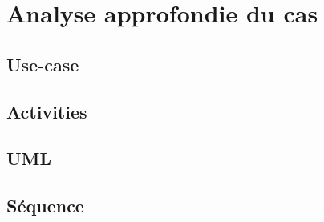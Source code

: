 \section{Analyse approfondie du cas}
\subsection{Use-case}
\subsection{Activities}
\subsection{UML}
\subsection{Séquence}